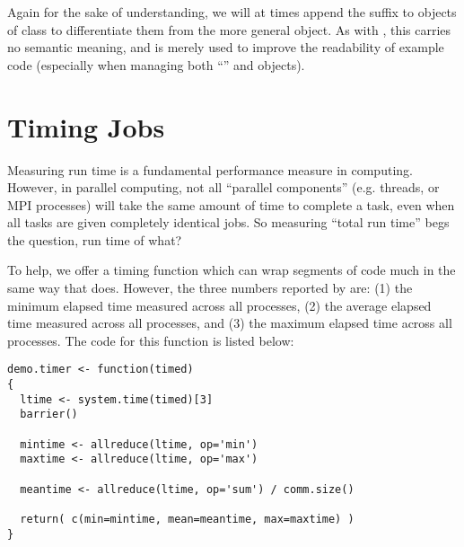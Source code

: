 Again for the sake of understanding, we will at times append the suffix  to objects of class  to differentiate them from the more general  object.  As with , this carries no semantic meaning, and is merely used to improve the readability of example code (especially when managing both ``'' and  objects).




\section{Timing Jobs}

Measuring run time is a fundamental performance measure in computing.  However, in parallel computing, not all ``parallel components'' (e.g. threads, or MPI processes) will take the same amount of time to complete a task, even when all tasks are given completely identical jobs.  So measuring ``total run time'' begs the question, run time of what?

To help, we offer a timing function  which can wrap segments of code much in the same way that  does.  However, the three numbers reported by  are: (1) the minimum elapsed time measured across all processes, (2) the average elapsed time measured across all processes, and (3) the maximum elapsed time across all processes.  The code for this function is listed below:

\begin{lstlisting}[language=rr,title=Timer Function]
demo.timer <- function(timed)
{
  ltime <- system.time(timed)[3]
  barrier()
  
  mintime <- allreduce(ltime, op='min')
  maxtime <- allreduce(ltime, op='max')
  
  meantime <- allreduce(ltime, op='sum') / comm.size()
  
  return( c(min=mintime, mean=meantime, max=maxtime) )
}
\end{lstlisting}


